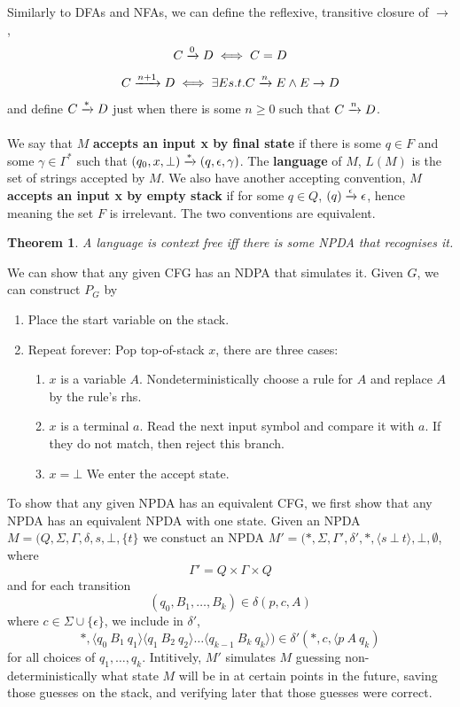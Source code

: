 \documentclass{article}
\newtheorem{thm}{Theorem}
\newcommand{\Trans}[3]{ #1 \xrightarrow{ #2 }\mathrel{\vphantom{\to}} #3 }
\begin{document}
        Similarly to DFAs and NFAs, we can define the reflexive, transitive closure of $\to$,
        \[ \Trans{C}{0}{D} \iff C=D \]
        \[ \Trans{C}{n+1}{D} \iff \exists E s.t. \Trans{C}{n}{E} \land E \to D\]
        and define $\Trans{C}{*}{D}$ just when there is some $n \geq 0$ such that $\Trans{C}{n}{D}$. \\ \\
        We say that $M$ \textbf{accepts an input x by final state} if there is some $q \in F$ and some $\gamma \in \Gamma^*$ such that $\Trans{(q_0, x, \bot)}{*}{(q, \epsilon, \gamma)}$. The \textbf{language} of $M$, $L(M)$ is the set of strings accepted by $M$. We also have another accepting convention, $M$ \textbf{accepts an input x by empty stack} if for some $q \in Q$, $\Trans{(q)}{\epsilon}{\epsilon}$, hence meaning the set $F$ is irrelevant. The two conventions are equivalent. 
        \begin{thm}
            A language is context free iff there is some NPDA that recognises it.
        \end{thm}
        We can show that any given CFG has an NDPA that simulates it. Given $G$, we can construct $P_G$ by
        \begin{enumerate}
            \item Place the start variable on the stack.
            \item Repeat forever: Pop top-of-stack $x$, there are three cases:
            \begin{enumerate}
                \item $x$ is a variable $A$. Nondeterministically choose a rule for $A$ and replace $A$ by the rule's rhs. 
                \item $x$ is a terminal $a$. Read the next input symbol and compare it with $a$. If they do not match, then reject this branch. 
                \item $x = \bot$ We enter the accept state. 
            \end{enumerate}
        \end{enumerate}
        To show that any given NPDA has an equivalent CFG, we first show that any NPDA has an equivalent NPDA with one state. Given an NPDA $M=(Q, \Sigma, \Gamma, \delta, s, \bot, \{t\}$ we constuct an NPDA $M'=({ * }, \Sigma, \Gamma', \delta', *,  \langle s \ \bot \ t\rangle, \bot, \emptyset$, where
        \[ \Gamma' = Q \times \Gamma \times Q \]
        and for each transition 
        \[ (q_0, B_1, \ldots, B_k) \in \delta(p, c, A) \]
        where $c \in \Sigma \cup \{ \epsilon \}$, we include in $\delta'$,
        \[ *, \langle q_0 \ B_1 \ q_1 \rangle \langle q_1 \ B_2 \ q_2 \rangle \ldots \langle q_{k-1} \ B_k \ q_k \rangle ) \in \delta'(*, c, \langle p \ A \ q_k)  \]
        for all choices of $q_1, \ldots, q_k$. Intitively, $M'$ simulates $M$ guessing non-deterministically what state $M$ will be in at certain points in the future, saving those guesses on the stack, and verifying later that those guesses were correct. \\ \\
    
\end{document}
